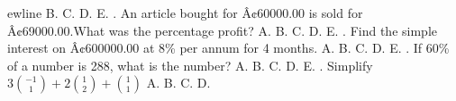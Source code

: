 \documentclass{article}
\begin{document}
\begin{multicols}{2}
ewline \indent B. \newline \indent C. \newline \indent D. \newline \indent E.  \newline{}. An article bought for Â¢60000.00 is sold for Â¢69000.00.What was the percentage profit? \newline \indent A. \newline \indent B. \newline \indent C. \newline \indent D. \newline \indent E.  \newline{}. Find the simple interest on Â¢600000.00 at 8\% per annum for 4 months. \newline \indent A. \newline \indent B. \newline \indent C. \newline \indent D. \newline \indent E.  \newline{}. If 60\% of a number is 288, what is the number? \newline \indent A. \newline \indent B. \newline \indent C. \newline \indent D. \newline \indent E.  \newline{}.  Simplify \(3\binom{-1}{1}+2\binom{1}{2}+\binom{1}{1}\) \newline \indent A. \newline \indent B. \newline \indent C. \newline \indent D. \n
\end{multicols}
\end{document}
